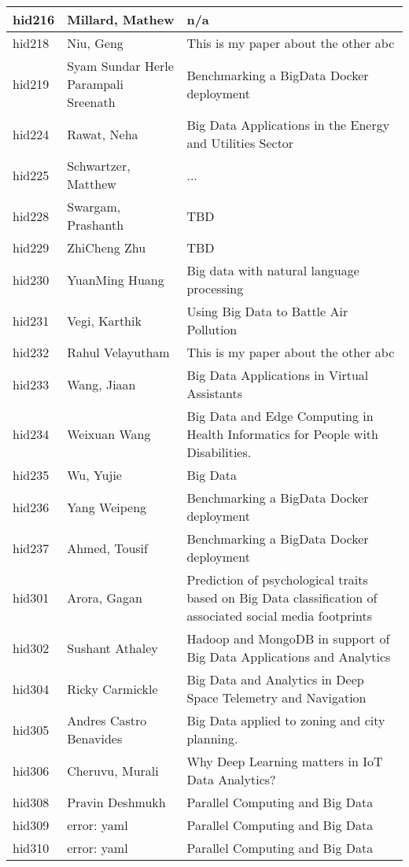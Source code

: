 \documentclass[12pt]{book}
\begin{document}
\begin{footnotesize}
\begin{longtable}{|p{1cm}p{5cm}p{9cm}|}
\hline
hid216 & Millard, Mathew & n/a  \\
\hline
hid218 & Niu, Geng & This is my paper about the other abc  \\
\hline
hid219 & Syam Sundar Herle Parampali Sreenath & Benchmarking a BigData Docker deployment  \\
\hline
hid224 & Rawat, Neha & Big Data Applications in the Energy and Utilities Sector  \\
\hline
hid225 & Schwartzer, Matthew & ...  \\
\hline
hid228 & Swargam, Prashanth & TBD  \\
\hline
hid229 & ZhiCheng Zhu & TBD  \\
\hline
hid230 & YuanMing Huang & Big data with natural language processing  \\
\hline
hid231 & Vegi, Karthik & Using Big Data to Battle Air Pollution  \\
\hline
hid232 & Rahul Velayutham & This is my paper about the other abc  \\
\hline
hid233 & Wang, Jiaan & Big Data Applications in Virtual Assistants  \\
\hline
hid234 & Weixuan Wang & Big Data and Edge Computing in Health Informatics for People with Disabilities.  \\
\hline
hid235 & Wu, Yujie & Big Data  \\
\hline
hid236 & Yang Weipeng & Benchmarking a BigData Docker deployment  \\
\hline
hid237 & Ahmed, Tousif & Benchmarking a BigData Docker deployment  \\
\hline
hid301 & Arora, Gagan & Prediction of psychological traits based on Big Data classification of associated social media footprints  \\
\hline
hid302 & Sushant Athaley & Hadoop and MongoDB in support of Big Data Applications and Analytics  \\
\hline
hid304 & Ricky Carmickle & Big Data and Analytics in Deep Space Telemetry and Navigation  \\
\hline
hid305 & Andres Castro Benavides & Big Data applied to zoning and city planning.  \\
\hline
hid306 & Cheruvu, Murali & Why Deep Learning matters in IoT Data Analytics?  \\
\hline
hid308 & Pravin Deshmukh & Parallel Computing and Big Data  \\
\hline
hid309 & error: yaml & Parallel Computing and Big Data  \\
\hline
hid310 & error: yaml & Parallel Computing and Big Data  \\

\end{longtable}
\end{footnotesize}
\end{document}

